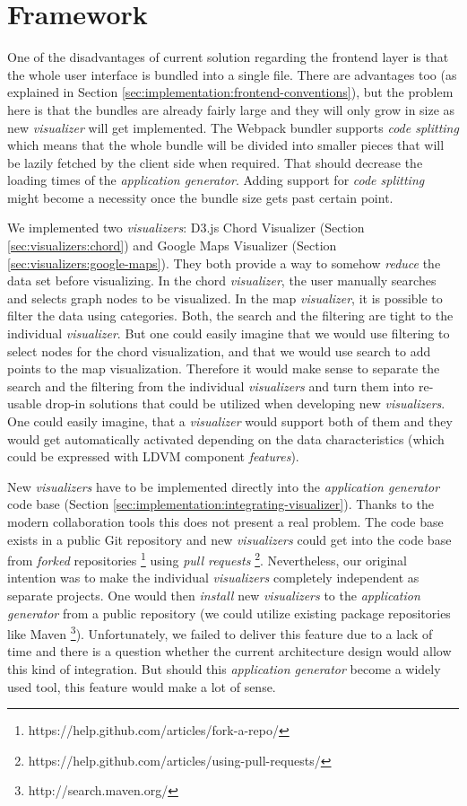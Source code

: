 \section{Framework}

One of the disadvantages of current solution regarding the frontend layer is that the whole user interface is bundled into a single file. There are advantages too (as explained in Section \ref{sec:implementation:frontend-conventions}), but the problem here is that the bundles are already fairly large and they will only grow in size as new \emph{visualizer} will get implemented. The Webpack bundler supports \emph{code splitting} which means that the whole bundle will be divided into smaller pieces that will be lazily fetched by the client side when required. That should decrease the loading times of the \emph{application generator}. Adding support for \emph{code splitting} might become a necessity once the bundle size gets past certain point.

We implemented two \emph{visualizers}: D3.js Chord Visualizer (Section \ref{sec:visualizers:chord}) and Google Maps Visualizer (Section \ref{sec:visualizers:google-maps}). They both provide a way to somehow \emph{reduce} the data set before visualizing. In the chord \emph{visualizer}, the user manually searches and selects graph nodes to be visualized. In the map \emph{visualizer}, it is possible to filter the data using categories. Both, the search and the filtering are tight to the individual \emph{visualizer}. But one could easily imagine that we would use filtering to select nodes for the chord visualization, and that we would use search to add points to the map visualization. Therefore it would make sense to separate the search and the filtering from the individual \emph{visualizers} and turn them into re-usable drop-in solutions that could be utilized when developing new \emph{visualizers}. One could easily imagine, that a \emph{visualizer} would support both of them and they would get automatically activated depending on the data characteristics (which could be expressed with LDVM component \emph{features}).

New \emph{visualizers} have to be implemented directly into the \emph{application generator} code base (Section \ref{sec:implementation:integrating-visualizer}). Thanks to the modern collaboration tools this does not present a real problem. The code base exists in a public Git repository and new \emph{visualizers} could get into the code base from \emph{forked} repositories \footnote{https://help.github.com/articles/fork-a-repo/} using \emph{pull requests} \footnote{https://help.github.com/articles/using-pull-requests/}. Nevertheless, our original intention was to make the individual \emph{visualizers} completely independent as separate projects. One would then \emph{install} new \emph{visualizers} to the \emph{application generator} from a public repository (we could utilize existing package repositories like Maven \footnote{http://search.maven.org/}). Unfortunately, we failed to deliver this feature due to a lack of time and there is a question whether the current architecture design would allow this kind of integration. But should this \emph{application generator} become a widely used tool, this feature would make a lot of sense.

